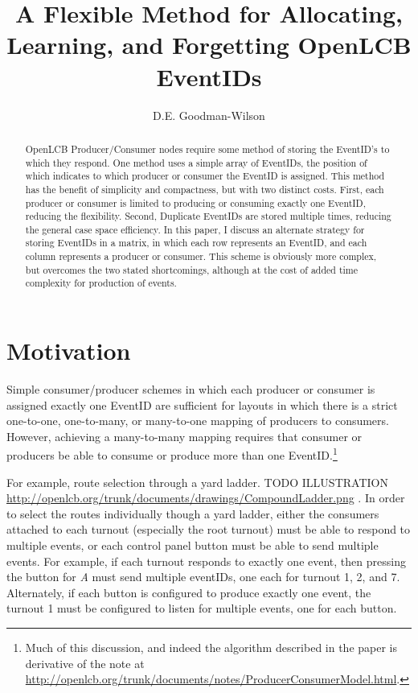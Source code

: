 \documentclass[11pt]{article}
\title{A Flexible Method for Allocating, Learning, and Forgetting OpenLCB EventIDs}
\author{D.E. Goodman-Wilson}
\begin{document}
\maketitle
\begin{abstract}
OpenLCB Producer/Consumer nodes require some method of storing the EventID's to which they respond. One method uses a simple array of EventIDs, the position of which indicates to which producer or consumer the EventID is assigned. This method has the benefit of simplicity and compactness, but with two distinct costs. First, each producer or consumer is limited to producing or consuming exactly one EventID, reducing the flexibility. Second, Duplicate EventIDs are stored multiple times, reducing the general case space efficiency. In this paper, I discuss an alternate strategy for storing EventIDs in a matrix, in which each row represents an EventID, and each column represents a producer or consumer. This scheme is obviously more complex, but overcomes the two stated shortcomings, although at the cost of added time complexity for production of events.
\end{abstract}

\tableofcontents

\section{Motivation}

Simple consumer/producer schemes in which each producer or consumer is assigned exactly one EventID are sufficient for layouts in which there is a strict one-to-one, one-to-many, or many-to-one mapping of producers to consumers. However, achieving a many-to-many mapping requires that consumer or producers be able to consume or produce more than one EventID.\footnote{Much of this discussion, and indeed the algorithm described in the paper is derivative of the note at \url{http://openlcb.org/trunk/documents/notes/ProducerConsumerModel.html}.}

For example, route selection through a yard ladder. TODO ILLUSTRATION \url{http://openlcb.org/trunk/documents/drawings/CompoundLadder.png} . In order to select the routes individually though a yard ladder, either the consumers attached to each turnout (especially the root turnout) must be able to respond to multiple events, or each control panel button must be able to send multiple events. For example, if each turnout responds to exactly one event, then pressing the button for \textit{A} must send multiple eventIDs, one each for turnout 1, 2, and 7. Alternately, if each button is configured to produce exactly one event, the turnout 1 must be configured to listen for multiple events, one for each button.
\end{document}
